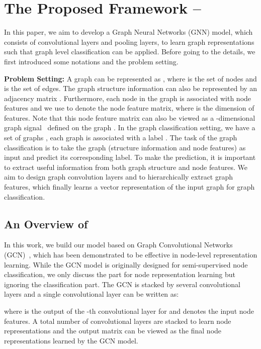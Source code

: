 \documentclass[sigconf]{acmart}
\newcommand{\m}{{\sf {EigenGCN}}}
\begin{document}
 \section{The Proposed Framework -- } \label{sec:proposed} 

In this paper, we aim to develop a Graph Neural Networks (GNN) model, which consists of convolutional layers and pooling layers, to learn graph representations such that graph level classification can be applied. Before going to the details, we first introduced some notations and the problem setting. 

\vspace{0.5em}
\noindent{}\textbf{Problem Setting:} A graph can be represented as , where  is the set of  nodes and  is the set of edges. The graph structure information can also be represented by an adjacency matrix . Furthermore, each node in the graph is associated with node features and we use  to denote the node feature matrix, where  is the dimension of features. Note that this node feature matrix can also be viewed as a -dimensional graph signal~\cite{shuman2013emerging} defined on the graph . In the graph classification setting, we have a set of graphs , each graph  is associated with a label . The task of the graph classification is to take the graph (structure information and node features) as input and predict its corresponding label. To make the prediction, it is important to extract useful information from both graph structure and node features. We aim to design graph convolution layers and  to hierarchically extract graph features, which finally learns a vector representation of the input graph for graph classification. 


\subsection{An Overview of \m}
In this work, we build our model based on Graph Convolutional Networks (GCN)~\cite{kipf2016semi}, which has been demonstrated to be effective in node-level representation learning. While the GCN model is originally designed for semi-supervised node classification, we only discuss the part for node representation learning but ignoring the classification part. The GCN is stacked by several convolutional layers and a single convolutional layer can be written as:

where  is the output of the -th convolutional layer for  and  denotes the input node features. A total number of  convolutional layers are stacked to learn node representations and the output matrix  can be viewed as the final node representations learned by the GCN model. 
\end{document}
